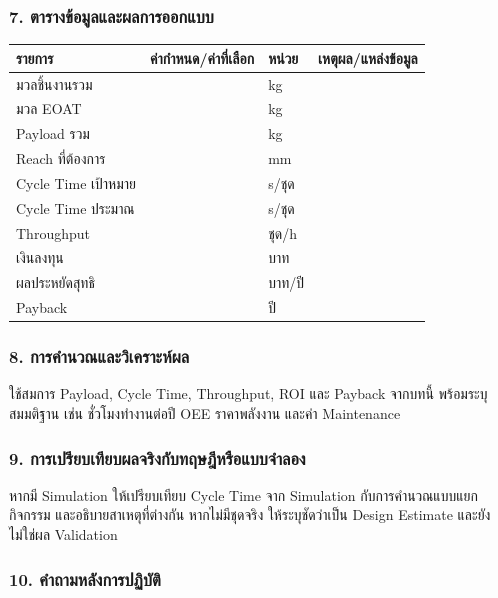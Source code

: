 \subsubsection{7. ตารางข้อมูลและผลการออกแบบ}

\begin{table}[htbp]
    \centering
    \begin{tabular}{l r l l}
        \hline
        \textbf{รายการ} & \textbf{ค่ากำหนด/ค่าที่เลือก} & \textbf{หน่วย} & \textbf{เหตุผล/แหล่งข้อมูล} \\
        \hline
        มวลชิ้นงานรวม &  & kg &  \\
        มวล EOAT &  & kg &  \\
        Payload รวม &  & kg &  \\
        Reach ที่ต้องการ &  & mm &  \\
        Cycle Time เป้าหมาย &  & s/ชุด &  \\
        Cycle Time ประมาณ &  & s/ชุด &  \\
        Throughput &  & ชุด/h &  \\
        เงินลงทุน &  & บาท &  \\
        ผลประหยัดสุทธิ &  & บาท/ปี &  \\
        Payback &  & ปี &  \\
        \hline
    \end{tabular}
\end{table}

\subsubsection{8. การคำนวณและวิเคราะห์ผล}

ใช้สมการ Payload, Cycle Time, Throughput, ROI และ Payback จากบทนี้ พร้อมระบุสมมติฐาน เช่น ชั่วโมงทำงานต่อปี OEE ราคาพลังงาน และค่า Maintenance

\subsubsection{9. การเปรียบเทียบผลจริงกับทฤษฎีหรือแบบจำลอง}

หากมี Simulation ให้เปรียบเทียบ Cycle Time จาก Simulation กับการคำนวณแบบแยกกิจกรรม และอธิบายสาเหตุที่ต่างกัน หากไม่มีชุดจริง ให้ระบุชัดว่าเป็น Design Estimate และยังไม่ใช่ผล Validation

\subsubsection{10. คำถามหลังการปฏิบัติ}


